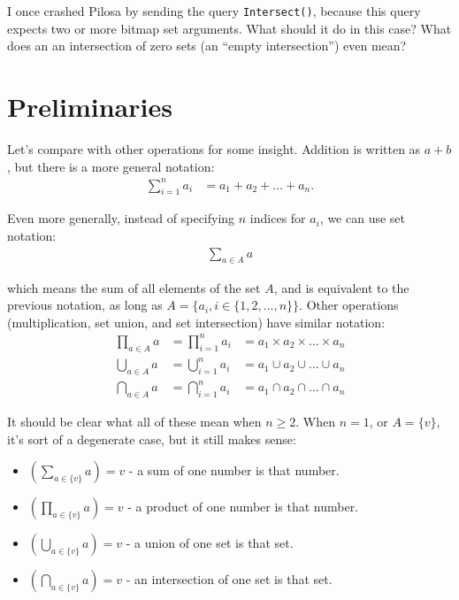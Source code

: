 \documentclass{article}
\begin{document}
I once crashed Pilosa by sending the query \texttt{Intersect()}, because this query expects two or more bitmap set arguments. What should it do in this case? What does an an intersection of zero sets (an ``empty intersection'') even mean?

\section{Preliminaries}

Let's compare with other operations for some insight. Addition is written as $a+b$, but there is a more general notation: 
\begin{align}
\sum\limits_{i=1}^{n}a_i &= a_1 + a_2 + ... + a_n.
\end{align}

Even more generally, instead of specifying $n$ indices for $a_i$, we can use set notation:
\begin{align}
\sum\limits_{a \in A}^{}a
\end{align}

which means the sum of all elements of the set $A$, and is equivalent to the previous notation, as long as $A = \{a_i, i \in \{1, 2, ..., n\}\}$. Other operations (multiplication, set union, and set intersection) have similar notation:
\begin{align}
\prod\limits_{a \in A}^{}a &= \prod\limits_{i=1}^{n}a_i &= a_1 \times a_2 \times ... \times a_n\\
\bigcup\limits_{a \in A}^{}a &= \bigcup\limits_{i=1}^{n}a_i &= a_1 \cup a_2 \cup ... \cup a_n\\
\bigcap\limits_{a \in A}^{}a &= \bigcap\limits_{i=1}^{n}a_i &= a_1 \cap a_2 \cap ... \cap a_n
\end{align}

It should be clear what all of these mean when $n \ge 2$. When $n=1$, or $A=\{v\}$, 
it's sort of a degenerate case, but it still makes sense: 
\begin{itemize}
\item $\left(\sum\limits_{a\in \{v\}}a\right) = v$ - a sum of one number is that number.\\
\item $\left(\prod\limits_{a\in \{v\}}a\right) = v$ - a product of one number is that number.\\
\item $\left(\bigcup\limits_{a\in \{v\}}a\right) = v$ - a union of one set is that set.\\
\item $\left(\bigcap\limits_{a\in \{v\}}a\right) = v$ - an intersection of one set is that set.\\
\end{itemize}
\end{document}
